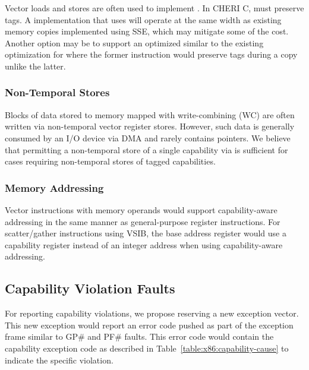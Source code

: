 Vector loads and stores are often used to implement .
In CHERI C,  must preserve tags.  A 
implementation that uses  will operate at the same
width as existing memory copies implemented using SSE, which may
mitigate some of the cost.  Another option may be to support an
optimized  similar to the existing optimization
for  where the former instruction would preserve
tags during a copy unlike the latter.

\subsubsection{Non-Temporal Stores}

Blocks of data stored to memory mapped with write-combining (WC) are
often written via non-temporal vector register stores.  However, such
data is generally consumed by an I/O device via DMA and rarely
contains pointers.  We believe that permitting a non-temporal store of
a single capability via  is sufficient for cases
requiring non-temporal stores of tagged capabilities.

\subsubsection{Memory Addressing}

Vector instructions with memory operands would support
capability-aware addressing in the same manner as general-purpose
register instructions.  For scatter/gather instructions using VSIB,
the base address register would use a capability register instead of
an integer address when using capability-aware addressing.

\subsection{Capability Violation Faults}
\label{sec:x86:capability-fault}

For reporting capability violations, we propose reserving a new
exception vector.  This new exception would report an error code
pushed as part of the exception frame similar to GP\# and PF\# faults.
This error code would contain the capability exception code as
described in Table~\ref{table:x86:capability-cause} to indicate
the specific violation.

